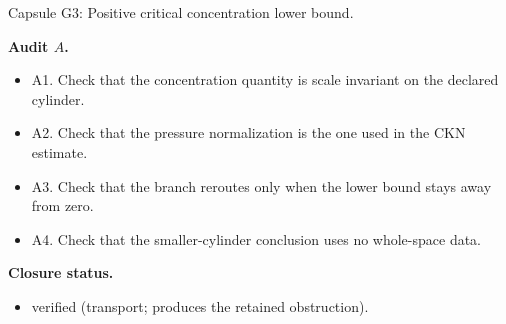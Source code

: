 \documentclass[11pt]{amsart}
\newcommand{\capsulefield}[1]{\par\smallskip\noindent\textbf{#1.}\ }
\begin{document}
\begin{proofcapsule}{Capsule G3: Positive critical concentration lower bound.}
  \capsulefield{Audit \(A\)}
  \begin{itemize}[leftmargin=1.8em]
  \item A1. Check that the concentration quantity is scale invariant on the declared cylinder.
  \item A2. Check that the pressure normalization is the one used in the CKN estimate.
  \item A3. Check that the branch reroutes only when the lower bound stays away from zero.
  \item A4. Check that the smaller-cylinder conclusion uses no whole-space data.
  \end{itemize}
  \capsulefield{Closure status}
  \begin{itemize}[leftmargin=1.8em]
  \item verified (transport; produces the retained obstruction).
  \end{itemize}
\end{proofcapsule}
\end{document}
